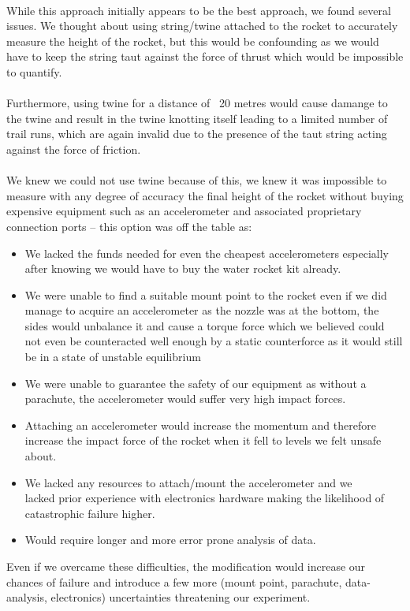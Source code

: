 \documentclass[14pt]{article}
\begin{document}
\paragraph{}
While this approach initially appears to be the best approach, we found several issues. 
We thought about using string/twine attached to the rocket to accurately measure the height of the rocket, but this would be confounding as we would have to keep the string taut against the force of thrust which would be impossible to quantify. \\\\Furthermore, using twine for a distance of ~20 metres would cause damange to the twine and result in the twine knotting itself leading to a limited number of trail runs, which are again invalid due to the presence of the taut string acting against the force of friction. \\\\
We knew we could not use twine because of this, we knew it was impossible to measure with any degree of accuracy the final height of the rocket without buying expensive equipment such as an accelerometer and associated proprietary connection ports -- this option was off the table as:
\begin{itemize}
    \item We lacked the funds needed for even the cheapest accelerometers especially after knowing we would have to buy the water rocket kit already.
    \item We were unable to find a suitable mount point to the rocket even if we did manage to acquire an accelerometer as the nozzle was at the bottom, the sides would unbalance it and cause a torque force which we believed could not even be counteracted well enough by a static counterforce as it would still be in a state of unstable equilibrium
    \item We were unable to guarantee the safety of our equipment as without a parachute, the accelerometer would suffer very high impact forces. 
    \item Attaching an accelerometer would increase the momentum and therefore increase the impact force of the rocket when it fell to levels we felt unsafe about.
    \item We lacked any resources to attach/mount the accelerometer and we \\lacked prior experience with electronics hardware making the likelihood of catastrophic failure higher.
    \item Would require longer and more error prone analysis of data.

\end{itemize}
Even if we overcame these difficulties, the modification would increase our chances of failure and introduce a few more (mount point, parachute, data-analysis, electronics) uncertainties threatening our experiment. 
\end{document}
